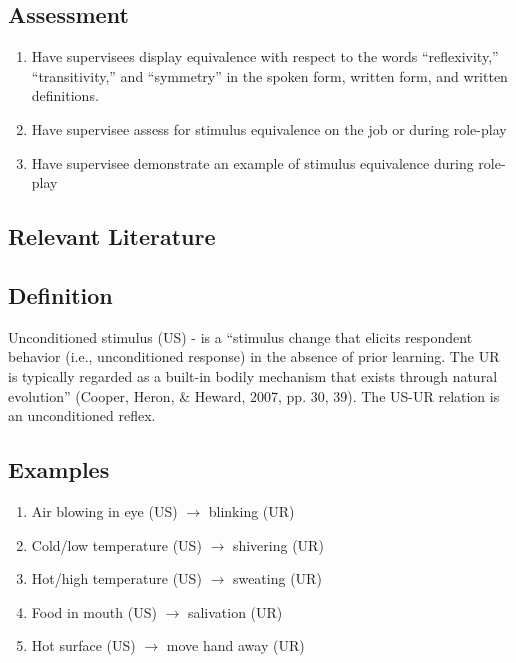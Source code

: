 \subsection{Assessment}
\begin{enumerate}
\item Have supervisees display equivalence with respect to the words ``reflexivity,'' ``transitivity,'' and ``symmetry'' in the spoken form, written form, and written definitions.
\item Have supervisee assess for stimulus equivalence on the job or during role-play 
\item Have supervisee demonstrate an example of stimulus equivalence during role-play
%
\end{enumerate}
%
\subsection{Relevant Literature}
\begin{refsection}
\nocite{cooper2007applied,
        sidman1997equivalence,
        sidman2009equivalence}
\printbibliography[heading=none]
\end{refsection}
%
\subsection{Definition} 
Unconditioned stimulus (US) - is a ``stimulus change that elicits respondent behavior (i.e., unconditioned response) in the absence of prior learning.  The UR is typically regarded as a built-in bodily mechanism that exists through natural evolution'' (Cooper, Heron, \& Heward, 2007, pp. 30, 39).   The US-UR relation is an unconditioned reflex.
%
\subsection{Examples}
\begin{enumerate}
\item Air blowing in eye (US) $\rightarrow$ blinking (UR)
\item Cold/low temperature (US) $\rightarrow$ shivering (UR)
\item Hot/high temperature (US) $\rightarrow$ sweating (UR)
\item Food in mouth (US) $\rightarrow$ salivation (UR)
\item Hot surface (US) $\rightarrow$ move hand away (UR)
%
\end{enumerate}
%
